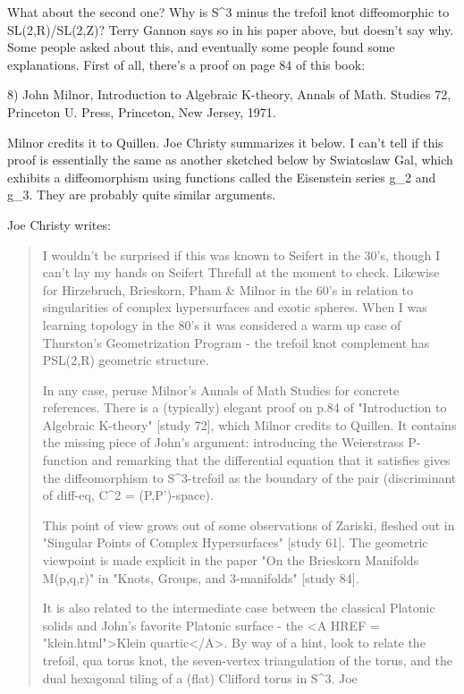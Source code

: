 What about the second one?  Why is  S^{3} minus the trefoil knot 
diffeomorphic
to SL(2,R)/SL(2,Z)?   Terry Gannon says so in his paper above, but doesn't
say why.  Some people asked about this, and eventually some people found
some explanations.  First of all, there's a proof on page 84 of this book:

8) John Milnor, Introduction to Algebraic K-theory, Annals of Math.
Studies 72, Princeton U. Press, Princeton, New Jersey, 1971.

Milnor credits it to Quillen.  Joe Christy summarizes it below.  I
can't tell if this proof is essentially the same as another sketched
below by Swiatoslaw Gal, which exhibits a diffeomorphism using
functions called the Eisenstein series g_{2} and
g_{3}.  They are probably quite similar arguments.

Joe Christy writes:

\begin{quote}
  I wouldn't be surprised if this was known to Seifert in the 30's,
  though I can't lay my hands on Seifert \text{\&}  Threfall at the moment to
  check. Likewise for Hirzebruch, Brieskorn, Pham & Milnor in the 60's in
  relation to singularities of complex hypersurfaces and exotic spheres.
  When I was learning topology in the 80's it was considered a warm up
  case of Thurston's Geometrization Program - the trefoil knot complement
  has PSL(2,R) geometric structure.

  In any case, peruse Milnor's Annals of Math Studies for concrete
  references. There is a (typically) elegant proof on p.84 of
  "Introduction to Algebraic K-theory" [study 72], which Milnor credits 
  to Quillen. It contains the missing piece of John's argument:
  introducing the Weierstrass P-function and remarking that the
  differential equation that it satisfies gives the diffeomorphism to
  S^{3}-trefoil as the boundary of the pair (discriminant of diff-eq, 
  C^{2} = (P,P')-space).

  This point of view grows out of some observations of Zariski, fleshed
  out in "Singular Points of Complex Hypersurfaces" [study 61]. The
  geometric viewpoint is made explicit in the paper "On the Brieskorn
  Manifolds M(p,q,r)" in "Knots, Groups, and 3-manifolds" [study 84].

  It is also related to the intermediate case between the classical
  Platonic solids and John's favorite Platonic surface - the 
  <A HREF = "klein.html">Klein quartic</A>.  By way of a hint, look to
  relate the trefoil, qua torus knot, the seven-vertex triangulation of
  the torus, and the dual hexagonal tiling of a (flat) Clifford torus in 
  S^{3}.
  Joe
\end{quote}

